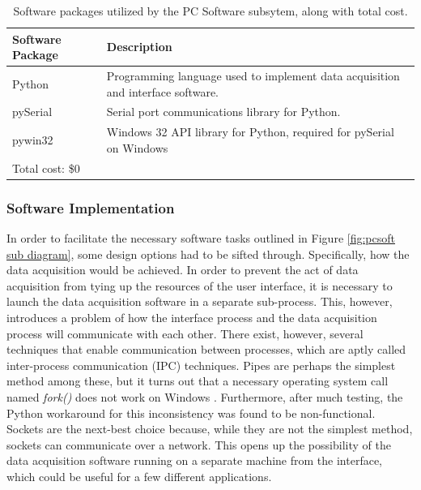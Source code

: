 \begin{table}[bhp]
\begin{tabular}{l | p{8cm}}
	Software Package & Description \\ \hline
	Python & Programming language used to implement data acquisition and interface software. \\ 
	\hline
	pySerial & Serial port communications library for Python. \\
	\hline
	pywin32 & Windows 32 API library for Python, required for pySerial on Windows \\
	\hline
	\multicolumn{2}{l}{Total cost: \$0} \\
\end{tabular}
\caption[Software packages]{Software packages utilized by the PC Software subsytem, along with total cost.}
\label{tab:software packages}
\end{table}


\subsubsection[Software Implementation]{Software Implementation}
In order to facilitate the necessary software tasks outlined in Figure 
\ref{fig:pcsoft sub diagram}, some design options had to be sifted through. Specifically, 
how the data acquisition would be achieved. In order to prevent the act of data 
acquisition from tying up the resources of the user interface, it is necessary to launch 
the data acquisition software in a separate sub-process. This, however, introduces a 
problem of how the interface process and the data acquisition process will communicate with 
each other. There exist, however, several techniques that enable communication between 
processes, which are aptly called inter-process communication (IPC) techniques. Pipes are 
perhaps the simplest method among these, but it turns out that a necessary operating system 
call named \textit{fork()} does not work on Windows \cite{web:windowsfork}. Furthermore, 
after much testing, the Python workaround for this inconsistency was found to be non-functional. 
Sockets are the next-best choice because, while they are not the simplest method, sockets can
 communicate over a network. This opens up the possibility of the data acquisition software 
running on a separate machine from the interface, which could be useful for a few different 
applications.

